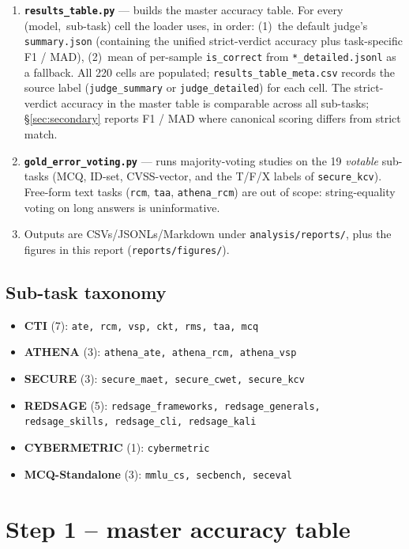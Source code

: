 \documentclass[10pt,a4paper]{article}
\begin{document}
\begin{enumerate}
\item \textbf{\texttt{results\_table.py}} --- builds the master accuracy table. For every \mbox{(model, sub-task)} cell the loader uses, in order: (1)~the default judge's \texttt{summary.json} (containing the unified strict-verdict accuracy plus task-specific F1 / MAD), (2)~mean of per-sample \texttt{is\_correct} from \texttt{*\_detailed.jsonl} as a fallback. All 220 cells are populated; \texttt{results\_table\_meta.csv} records the source label (\texttt{judge\_summary} or \texttt{judge\_detailed}) for each cell. The strict-verdict accuracy in the master table is comparable across all sub-tasks; \S\ref{sec:secondary} reports F1 / MAD where canonical scoring differs from strict match.
\item \textbf{\texttt{gold\_error\_voting.py}} --- runs majority-voting studies on the 19 \emph{votable} sub-tasks (MCQ, ID-set, CVSS-vector, and the T/F/X labels of \texttt{secure\_kcv}). Free-form text tasks (\texttt{rcm}, \texttt{taa}, \texttt{athena\_rcm}) are out of scope: string-equality voting on long answers is uninformative.
\item Outputs are CSVs/JSONLs/Markdown under \texttt{analysis/reports/}, plus the figures in this report (\texttt{reports/figures/}).
\end{enumerate}

\subsection*{Sub-task taxonomy}

\begin{itemize}
\item \textbf{CTI} (7): \texttt{ate, rcm, vsp, ckt, rms, taa, mcq}
\item \textbf{ATHENA} (3): \texttt{athena\_ate, athena\_rcm, athena\_vsp}
\item \textbf{SECURE} (3): \texttt{secure\_maet, secure\_cwet, secure\_kcv}
\item \textbf{REDSAGE} (5): \texttt{redsage\_frameworks, redsage\_generals, redsage\_skills, redsage\_cli, redsage\_kali}
\item \textbf{CYBERMETRIC} (1): \texttt{cybermetric}
\item \textbf{MCQ-Standalone} (3): \texttt{mmlu\_cs, secbench, seceval}
\end{itemize}

\section{Step 1 -- master accuracy table}
\end{document}
